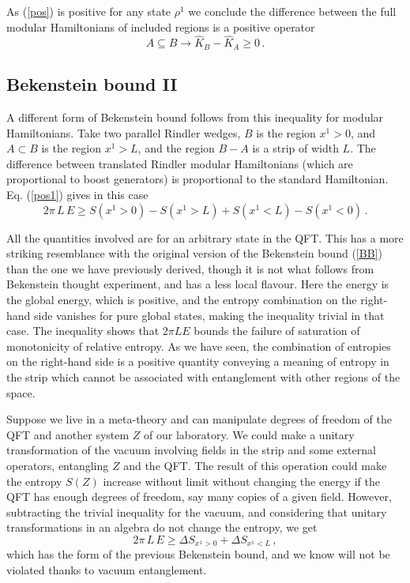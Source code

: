 \documentclass[11pt]{article}
\numberwithin{equation}{section}
\newcommand{\be}{\begin{equation}}
\newcommand{\ee}{\end{equation}}
\begin{document}
As (\ref{pos}) is positive for any state $\rho^1$ we conclude the difference between the full modular Hamiltonians of included regions is a positive operator
\be
A\subseteq B\rightarrow \hat{K}_B-\hat{K}_A\ge 0\,.\label{mono}
\ee
\subsection{Bekenstein bound II }

A different form of Bekenstein bound follows from this inequality for modular Hamiltonians. Take two parallel Rindler wedges, $B$ is the region $x^1>0$, and $A\subset B$ is the region $x^1>L$, and the region $B-A$ is a strip of width $L$. The difference between translated Rindler modular Hamiltonians (which are proportional to boost generators) is proportional to the standard Hamiltonian. Eq. (\ref{pos1}) gives in this case
\be
2 \pi \,L \,E\ge S(x^1>0)-S(x^1>L)+S(x^1<L)-S(x^1 <0)\,.    
\ee

All the quantities involved are for an arbitrary state in the QFT. This has a more striking resemblance with the original version of the Bekenstein bound (\ref{BB}) than the one we have previously derived, though it is not what follows from Bekenstein thought experiment, and has a less local flavour. Here the energy is the global energy, which is positive, and the entropy combination on the right-hand side vanishes for pure global states, making the inequality trivial in that case. The inequality shows that $2\pi L E $ bounds the failure of saturation of monotonicity of relative entropy. As we have seen, the combination of entropies on the right-hand side is a positive quantity conveying a meaning of entropy in the strip which cannot be associated with entanglement with other regions of the space. 

Suppose we live in a meta-theory and can manipulate degrees of freedom of the QFT and another system $Z$ of our laboratory. We could make a unitary transformation of the vacuum involving fields in the strip and some external operators, entangling $Z$ and the QFT. The result of this operation could make the entropy $S(Z)$ increase without limit without changing the energy if the QFT has enough degrees of freedom, say many copies of a given field. However, subtracting the trivial inequality for the vacuum, and considering that unitary transformations in an algebra do not change the entropy, we get 
\be
2\pi\,L\,  E\ge \Delta S_{x^1>0}+\Delta S_{x^1<L}\,,    
\ee
which has the form of the previous Bekenstein bound, and we know will not be violated thanks to vacuum entanglement.  
\end{document}
